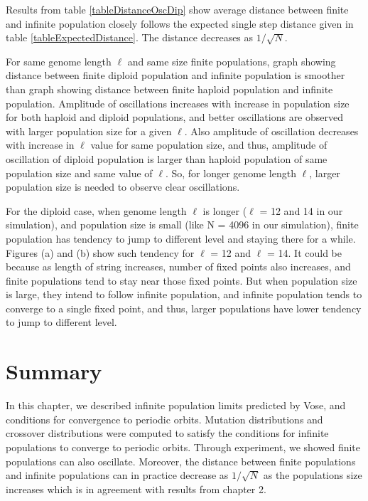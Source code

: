 Results from table \ref{tableDistanceOscDip} show average distance between finite and infinite population closely follows 
the expected single step distance given in table \ref{tableExpectedDistance}. The distance decreases as $1/\sqrt{N}$.

For same genome length $\ell$ and same size finite populations, graph showing distance between finite diploid population and infinite population is 
smoother than graph showing distance between finite haploid population and infinite population. 
Amplitude of oscillations increases with increase in population size for both haploid and diploid populations, 
and better oscillations are observed with larger population size for a given $\ell$. 
Also amplitude of oscillation decreases with increase in $\ell$ value for same population size, 
and thus, amplitude of oscillation of diploid population is larger than haploid population of same population size and same value of $\ell$. 
So, for longer genome length $\ell$, larger population size is needed to observe clear oscillations.

For the diploid case, when genome length $\ell$ is longer ($\ell$ = 12 and 14 in our simulation), 
and population size is small (like N = 4096 in our simulation), finite population has tendency to 
jump to different level and staying there for a while. Figures (a) and (b) show such tendency for 
$\ell$ = 12 and $\ell$ = 14. It could be because as length of string increases, 
number of fixed points also increases, and finite populations tend to stay near those fixed points. 
But when population size is large, they intend to follow infinite population, and infinite population tends to 
converge to a single fixed point, and thus, larger populations have lower tendency to jump to different level.

\section{Summary}
In this chapter, we described infinite population limits predicted by Vose, and conditions 
for convergence to periodic orbits. Mutation distributions and crossover distributions were computed 
to satisfy the conditions for infinite populations to converge to periodic orbits. Through experiment, 
we showed finite populations can also oscillate. 
Moreover, the distance between finite populations and infinite populations can in practice decrease 
as $1/\sqrt{N}$ as the populations size increases which is in agreement with results from 
chapter 2.





 
